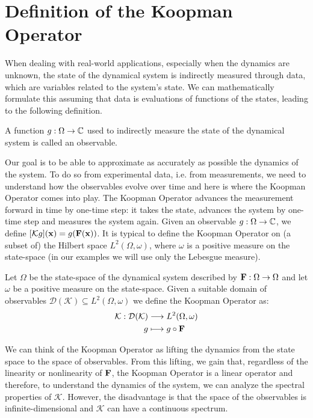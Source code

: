 \section{Definition of the Koopman Operator}
When dealing with real-world applications, especially when the dynamics are unknown, the state of the dynamical system is indirectly measured through data, which are variables related to the system's state. We can mathematically formulate this assuming that data is evaluations of functions of the states, leading to the following definition.

\begin{definition}[Observable]
A function $g:\Omega\to\mathbb{C}$ used to indirectly measure the state of the dynamical system is called an observable. 
\end{definition}

Our goal is to be able to approximate as accurately as possible the dynamics of the system. To do so from experimental data, i.e. from measurements, we need to understand how the observables evolve over time and here is where the Koopman Operator comes into play. The Koopman Operator advances the measurement forward in time by one-time step: it takes the state, advances the system by one-time step and measures the system again. Given an observable $g:\Omega\to\mathbb{C}$, we define $[\mathcal{K}g](\vb{x}) = g(\vb{F}(\vb{x}))$. It is typical to define the Koopman Operator on (a subset of) the Hilbert space $L^2(\Omega, \omega)$, where $\omega$ is a positive measure on the state-space (in our examples we will use only the Lebesgue measure).

\begin{definition}
Let $\Omega$ be the state-space of the dynamical system described by $\vb{F}:\Omega\to\Omega$ and let $\omega$ be a positive measure on the state-space. Given a suitable domain of observables $\mathcal{D}(\mathcal{K}) \subseteq L^2(\Omega, \omega)$ we define the Koopman Operator as:
\begin{equation}
    \label{koopman_def}
    \begin{split}
       \mathcal{K} : \mathcal{D}(\mathcal{K}) &\longrightarrow L^2(\Omega, \omega)
       \\
       g & \longmapsto g \circ \vb{F}
    \end{split}    
\end{equation} 
\end{definition}

We can think of the Koopman Operator as lifting the dynamics from the state space to the space of observables. From this lifting, we gain that, regardless of the linearity or nonlinearity of $\vb{F}$, the Koopman Operator is a linear operator and therefore, to understand the dynamics of the system, we can analyze the spectral properties of $\mathcal{K}$. However, the disadvantage is that the space of the observables is infinite-dimensional and $\mathcal{K}$ can have a continuous spectrum. 

